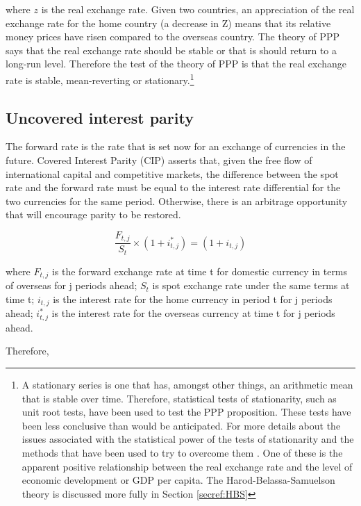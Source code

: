 \documentclass[12pt, a4paper, oneside]{article}\usepackage[]{graphicx}\usepackage[]{color}
\begin{document}
where $z$ is the real exchange rate. Given two countries, an appreciation of the real exchange rate for the home country (a decrease in Z) means that its relative money prices have risen compared to the overseas country.  The theory of PPP says that the real exchange rate should be stable or that is should return to a long-run level. Therefore the test of the theory of  PPP is that the real exchange rate is stable, mean-reverting or stationary.\footnote{A stationary series is one that has, amongst other things, an arithmetic mean that is stable over time.   Therefore, statistical tests of stationarity, such as unit root tests,  have been used to test the PPP proposition.  These tests have been less conclusive than would be anticipated.  For more details about the issues associated with the statistical power of the tests of stationarity and the methods that have been used to try to overcome them \citep{TaylorPPP}.  One of these is the apparent positive relationship between the real exchange rate and the level of economic development or GDP per capita.  The Harod-Belassa-Samuelson theory is discussed more fully in Section \ref{secref:HBS}} 

\subsection{Uncovered interest parity}
\label{secref:UIP}
The forward rate is the rate that is set now for an exchange of currencies in the future.  Covered Interest Parity (CIP) asserts that, given the free flow of international capital and competitive markets,  the difference between the spot rate and the forward rate must be equal to the interest rate differential for the two currencies for the same period.  Otherwise, there is an arbitrage opportunity that will encourage parity to be restored.  

\begin{equation}
\frac{F_{t, j}}{S_t} \times (1 + i_{t,j}^*) = (1 + i_{t,j})  
\end{equation}

where $F_{t, j}$ is the forward exchange rate at time t for domestic currency in terms of overseas for j periods ahead;  $S_t$ is spot exchange rate under the same terms at time t; $i_{t,j}$ is the interest rate for the home currency in period t for j periods ahead; $i_{t, j}^*$ is the interest rate for the overseas currency at time t for j periods ahead.

Therefore, 
\end{document}
